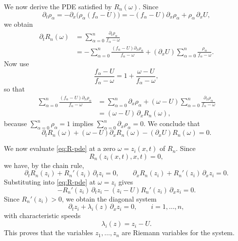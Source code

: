 \documentclass[12pt]{article}
\newcommand{\p}{\partial}
\begin{document}
We now derive the PDE satisfied by $R_n(\omega)$. Since
\[
\p_t\rho_\alpha = -\p_x\bigl(\rho_\alpha(f_\alpha-U)\bigr)
=-(f_\alpha-U)\p_x\rho_\alpha + \rho_\alpha\,\p_x U,
\]
we obtain
\begin{align*}
\p_t R_n(\omega)
&=
\sum_{\alpha=0}^n \frac{\p_t\rho_\alpha}{f_\alpha-\omega}
\\
&=
-\sum_{\alpha=0}^n \frac{(f_\alpha-U)\p_x\rho_\alpha}{f_\alpha-\omega}
+ (\p_x U)\sum_{\alpha=0}^n \frac{\rho_\alpha}{f_\alpha-\omega}.
\end{align*}
Now use
\[
\frac{f_\alpha-U}{f_\alpha-\omega}=1+\frac{\omega-U}{f_\alpha-\omega},
\]
so that
\begin{align*}
\sum_{\alpha=0}^n \frac{(f_\alpha-U)\p_x\rho_\alpha}{f_\alpha-\omega}
&=
\sum_{\alpha=0}^n \p_x\rho_\alpha
+
(\omega-U)\sum_{\alpha=0}^n \frac{\p_x\rho_\alpha}{f_\alpha-\omega}
\\
&=
(\omega-U)\,\p_x R_n(\omega),
\end{align*}
because $\sum_{\alpha=0}^n\rho_\alpha=1$ implies $\sum_{\alpha=0}^n\p_x\rho_\alpha=0$. We conclude that
\begin{equation}
\p_t R_n(\omega) + (\omega-U)\p_x R_n(\omega) - (\p_x U)R_n(\omega)=0.
\label{eq:R-pde}
\end{equation}


We now evaluate \eqref{eq:R-pde} at a zero $\omega=z_i(x,t)$ of $R_n$. Since
\[
R_n(z_i(x,t),x,t)=0,
\]
we have, by the chain rule,
\[
\p_t R_n(z_i)+R_n'(z_i)\,\p_t z_i = 0,
\qquad
\p_x R_n(z_i)+R_n'(z_i)\,\p_x z_i = 0.
\]
Substituting into \eqref{eq:R-pde} at $\omega=z_i$ gives
\[
-R_n'(z_i)\,\p_t z_i -(z_i-U)R_n'(z_i)\,\p_x z_i = 0.
\]
Since $R_n'(z_i)>0$, we obtain the diagonal system
\begin{equation}
\p_t z_i + \lambda_i(z)\,\p_x z_i = 0,
\qquad i=1,\dots,n,
\label{eq:diagonal-system}
\end{equation}
with characteristic speeds
\begin{equation}
\lambda_i(z)=z_i-U.
\label{eq:lambda-ri-minus-U}
\end{equation}
This proves that the variables $z_1,\dots,z_n$ are Riemann variables for the system.
\end{document}
